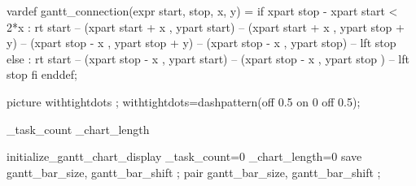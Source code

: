 

\unprotect


\startMPinitializations
  vardef gantt_connection(expr start, stop, x, y) =
    if xpart stop - xpart start < 2*x :
      rt start --
      (xpart start + x , ypart start) --
      (xpart start + x , ypart stop + y) --
      (xpart stop - x  , ypart stop + y) --
      (xpart stop - x  , ypart stop) --
      lft stop
    else :
      rt start --
      (xpart stop - x , ypart start) --
      (xpart stop - x , ypart stop ) --
      lft stop
    fi
  enddef;

  picture withtightdots ;
  withtightdots=dashpattern(off 0.5 on 0 off 0.5); %
\stopMPinitializations

\newcount\gantt_task_count
\newcount\gantt_chart_length

\starttexdefinition initialize_gantt_chart_display
   \gantt_task_count=0
   \gantt_chart_length=0
   \resetMPdrawing
   \startMPdrawing
     save gantt_bar_size, gantt_bar_shift ;
     pair gantt_bar_size, gantt_bar_shift ;

